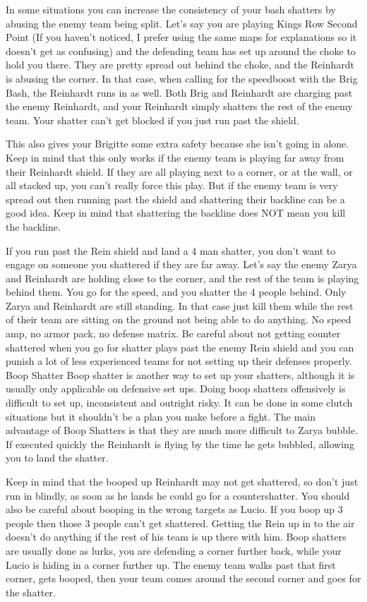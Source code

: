 In some situations you can increase the consistency of your bash shatters by abusing the enemy team being split. Let’s say you are playing Kings Row Second Point (If you haven’t noticed, I prefer using the same maps for explanations so it doesn’t get as confusing) and the defending team has set up around the choke to hold you there. They are pretty spread out behind the choke, and the Reinhardt is abusing the corner. In that case, when calling for the speedboost with the Brig Bash, the Reinhardt runs in as well. Both Brig and Reinhardt are charging past the enemy Reinhardt, and your Reinhardt simply shatters the rest of the enemy team. Your shatter can’t get blocked if you just run past the shield.

This also gives your Brigitte some extra safety because she isn’t going in alone. Keep in mind that this only works if the enemy team is playing far away from their Reinhardt shield. If they are all playing next to a corner, or at the wall, or all stacked up, you can’t really force this play. But if the enemy team is very spread out then running past the shield and shattering their backline can be a good idea. Keep in mind that shattering the backline does NOT mean you kill the backline. 

If you run past the Rein shield and land a 4 man shatter, you don’t want to engage on someone you shattered if they are far away. Let’s say the enemy Zarya and Reinhardt are holding close to the corner, and the rest of the team is playing behind them. You go for the speed, and you shatter the 4 people behind. Only Zarya and Reinhardt are still standing. In that case just kill them while the rest of their team are sitting on the ground not being able to do anything. No speed amp, no armor pack, no defense matrix. Be careful about not getting counter shattered when you go for shatter plays past the enemy Rein shield and you can punish a lot of less experienced teams for not setting up their defenses properly.
Boop Shatter
Boop shatter is another way to set up your shatters, although it is usually only applicable on defensive set ups. Doing boop shatters offensively is difficult to set up, inconsistent and outright risky. It can be done in some clutch situations but it shouldn’t be a plan you make before a fight. The main advantage of Boop Shatters is that they are much more difficult to Zarya bubble. If executed quickly the Reinhardt is flying by the time he gets bubbled, allowing you to land the shatter.

Keep in mind that the booped up Reinhardt may not get shattered, so don’t just run in blindly, as soon as he lands he could go for a countershatter. You should also be careful about booping in the wrong targets as Lucio. If you boop up 3 people then those 3 people can’t get shattered. Getting the Rein up in to the air doesn’t do anything if the rest of his team is up there with him. Boop shatters are usually done as lurks, you are defending a corner further back, while your Lucio is hiding in a corner further up. The enemy team walks past that first corner, gets booped, then your team comes around the second corner and goes for the shatter.

